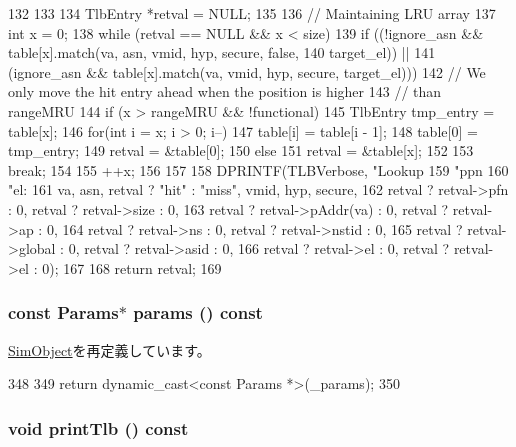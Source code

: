 \begin{DoxyCode}
132 {
133 
134     TlbEntry *retval = NULL;
135 
136     // Maintaining LRU array
137     int x = 0;
138     while (retval == NULL && x < size) {
139         if ((!ignore_asn && table[x].match(va, asn, vmid, hyp, secure, false,
140              target_el)) ||
141             (ignore_asn && table[x].match(va, vmid, hyp, secure, target_el))) {
142             // We only move the hit entry ahead when the position is higher
143             // than rangeMRU
144             if (x > rangeMRU && !functional) {
145                 TlbEntry tmp_entry = table[x];
146                 for(int i = x; i > 0; i--)
147                     table[i] = table[i - 1];
148                 table[0] = tmp_entry;
149                 retval = &table[0];
150             } else {
151                 retval = &table[x];
152             }
153             break;
154         }
155         ++x;
156     }
157 
158     DPRINTF(TLBVerbose, "Lookup %
159             "ppn %
160             "el: %
161             va, asn, retval ? "hit" : "miss", vmid, hyp, secure,
162             retval ? retval->pfn       : 0, retval ? retval->size  : 0,
163             retval ? retval->pAddr(va) : 0, retval ? retval->ap    : 0,
164             retval ? retval->ns        : 0, retval ? retval->nstid : 0,
165             retval ? retval->global    : 0, retval ? retval->asid  : 0,
166             retval ? retval->el        : 0, retval ? retval->el    : 0);
167 
168     return retval;
169 }
\end{DoxyCode}
\hypertarget{classArmISA_1_1TLB_acd3c3feb78ae7a8f88fe0f110a718dff}{
\subsubsection[{params}]{\setlength{\rightskip}{0pt plus 5cm}const {\bf Params}$\ast$ params () const}}
\label{classArmISA_1_1TLB_acd3c3feb78ae7a8f88fe0f110a718dff}


\hyperlink{classSimObject_acd3c3feb78ae7a8f88fe0f110a718dff}{SimObject}を再定義しています。


\begin{DoxyCode}
348     {
349         return dynamic_cast<const Params *>(_params);
350     }
\end{DoxyCode}
\hypertarget{classArmISA_1_1TLB_a48b5486ebf7c83e7c81025a032312ca6}{
\subsubsection[{printTlb}]{\setlength{\rightskip}{0pt plus 5cm}void printTlb () const}}
\label{classArmISA_1_1TLB_a48b5486ebf7c83e7c81025a032312ca6}



